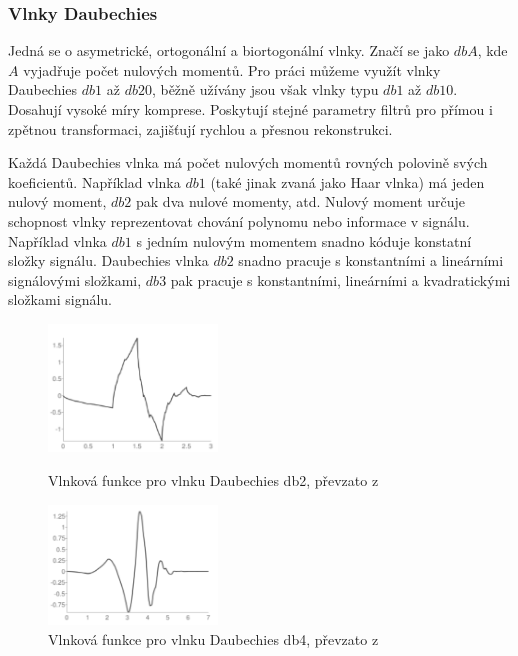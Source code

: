 \subsubsection{Vlnky Daubechies}

Jedná se o asymetrické, ortogonální a biortogonální vlnky. Značí se jako $dbA$, kde $A$ vyjadřuje počet nulových momentů. Pro práci můžeme využít vlnky Daubechies $db1$ až $db20$, běžně užívány jsou však vlnky typu $db1$ až $db10$. \cite{PyWaveletsBrowser} Dosahují vysoké míry komprese. Poskytují stejné parametry filtrů pro přímou i zpětnou transformaci, zajišťují rychlou a přesnou rekonstrukci. \cite{WaveletHlavac} 
    
Každá Daubechies vlnka má počet nulových momentů rovných polovině svých koeficientů. Například vlnka $db1$ (také jinak zvaná jako Haar vlnka) má jeden nulový moment, $db2$ pak dva nulové momenty, atd. Nulový moment určuje schopnost vlnky reprezentovat chování polynomu nebo informace v signálu. Například vlnka $db1$ s jedním nulovým momentem snadno kóduje konstatní složky signálu. Daubechies vlnka $db2$ snadno pracuje s konstantními a lineárními signálovými složkami, $db3$ pak pracuje s konstantními, lineárními a kvadratickými složkami signálu. \cite{WaveletsSignalImageProcessing}

\begin{figure}[!htbp]
  \begin{minipage}[b]{0.5\linewidth}
    \centering
    \includegraphics[width=170px]{obrazky-figures/db2wavelet.PNG}
    \caption{Vlnková funkce pro vlnku Daubechies db2, převzato z \cite{PyWaveletsBrowser}}
  \end{minipage}
  \hspace{0.5cm}
  \begin{minipage}[b]{0.5\linewidth}
    \centering
    \includegraphics[width=170px]{obrazky-figures/db4wavelet.PNG}
    \caption{Vlnková funkce pro vlnku Daubechies db4, převzato z \cite{PyWaveletsBrowser}}
  \end{minipage}
\end{figure}
    
